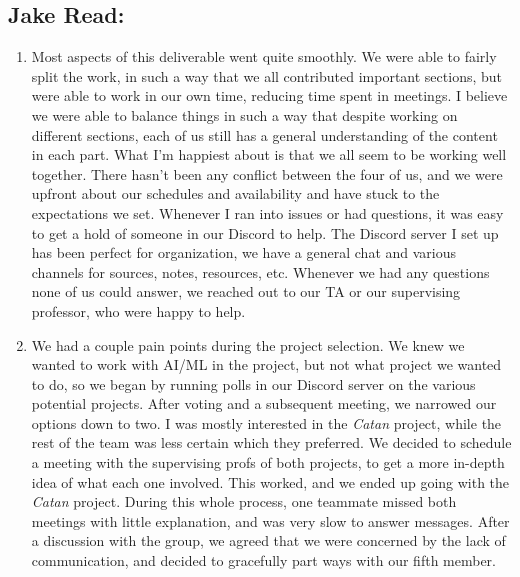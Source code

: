 \documentclass{article}
\begin{document}
\subsection*{Jake Read:}\label{subsec:jake-read-reflection}
\begin{enumerate}
    \item
        Most aspects of this deliverable went quite smoothly.
        We were able to fairly split the work, in such a way that we all contributed important sections, but were able to work in our own time, reducing time spent in meetings.
        I believe we were able to balance things in such a way that despite working on different sections, each of us still has a general understanding of the content in each part.
        What I'm happiest about is that we all seem to be working well together.
        There hasn't been any conflict between the four of us, and we were upfront about our schedules and availability and have stuck to the expectations we set.
        Whenever I ran into issues or had questions, it was easy to get a hold of someone in our Discord to help.
        The Discord server I set up has been perfect for organization, we have a general chat and various channels for sources, notes, resources, etc.
        Whenever we had any questions none of us could answer, we reached out to our TA or our supervising professor, who were happy to help.

    \item
        We had a couple pain points during the project selection.
        We knew we wanted to work with AI/ML in the project, but not what project we wanted to do, so we began by running polls in our Discord server on the various potential projects.
        After voting and a subsequent meeting, we narrowed our options down to two.
        I was mostly interested in the \emph{Catan} project, while the rest of the team was less certain which they preferred.
        We decided to schedule a meeting with the supervising profs of both projects, to get a more in-depth idea of what each one involved.
        This worked, and we ended up going with the \emph{Catan} project.
        During this whole process, one teammate missed both meetings with little explanation, and was very slow to answer messages.
        After a discussion with the group, we agreed that we were concerned by the lack of communication, and decided to gracefully part ways with our fifth member.


\end{enumerate}
\end{document}
